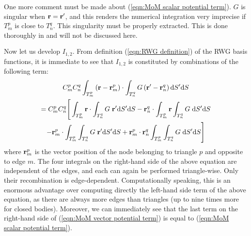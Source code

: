 %
\par
One more comment must be made about (\ref{eqn:MoM scalar potential term}). $G$ is singular when $\mathbf{r} = \mathbf{r}'$, and this renders the numerical integration very imprecise if $T_m^p$ is close to $T_n^q$. This singularity must be properly extracted. This is done thoroughly in \cite{Taskinen_03} and will not be discussed here.
%
\par
Now let us develop $I_{1,2}$. From definition (\ref{eqn:RWG definition}) of the RWG basis functions, it is immediate to see that $I_{1,2}$ is constituted by combinations of the following term:
\begin{multline}  \label{eqn:MoM vector potential term}
C_m^p C_n^q \int_{T_m^p} \left(\mathbf{r}-\mathbf{r}_m^p \right) \cdot \int_{T_n^q} G \left(\mathbf{r}'-\mathbf{r}_n^q \right) \text{d} S' \text{d} S \\
= C_m^p C_n^q \Bigg[ \int_{T_m^p} \mathbf{r} \cdot \int_{T_n^q} G \; \mathbf{r}' \text{d} S' \text{d} S  - \mathbf{r}_n^q \cdot \int_{T_m^p} \mathbf{r} \int_{T_n^q} G \; \text{d} S' \text{d} S \\
- \mathbf{r}_m^p \cdot \int_{T_m^p} \int_{T_n^q} G \; \mathbf{r}' \text{d} S' \text{d} S + \mathbf{r}_m^p \cdot \mathbf{r}_n^q \int_{T_m^p} \int_{T_n^q} G \; \text{d} S' \text{d} S \Bigg]
\end{multline}
where $\mathbf{r}_m^p$ is the vector position of the node belonging to triangle $p$ and opposite to edge $m$. The four integrals on the right-hand side of the above equation are independent of the edges, and each can again be performed triangle-wise. Only their recombination is edge-dependent. Computationally speaking, this is an enormous advantage over computing directly the left-hand side term of the above equation, as there are always more edges than triangles (up to nine times more for closed bodies). Moreover, we can immediately see that the last term on the right-hand side of (\ref{eqn:MoM vector potential term}) is equal to (\ref{eqn:MoM scalar potential term}).

